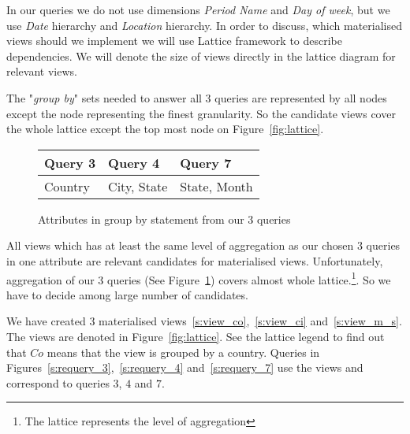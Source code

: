 
In our queries we do not use dimensions {\it Period Name} and {\it Day of week}, but 
we use {\it Date} hierarchy and {\it Location} hierarchy. 
In order to discuss, which materialised views should we implement we will use Lattice framework to describe dependencies. We will denote the size of views directly in the lattice diagram for relevant views.

 The "{\it group by}" sets needed to answer all 3 queries are represented by all nodes except the node representing the finest granularity. So the candidate views cover the whole lattice except the top most node on Figure~\ref{fig:lattice}. 


\begin{figure}[!hbp]
\caption{\label{t:groupby}Attributes in group by statement from our 3 queries}
\begin{center}
\begin{tabular}{|p{3cm}|p{3cm}|p{5cm}|}
\hline
Query 3 & Query 4 & Query  7\\
\hline
\hline
Country & City, State  & State, Month\\
\hline
\end{tabular}
\end{center}
\end{figure}

 All views which has at least the same level of aggregation as our chosen 3 queries in one attribute are relevant candidates for materialised views. Unfortunately, aggregation of our 3 queries (See Figure~\ref{t:groupby}) covers almost whole 
 lattice.\footnote{The lattice represents the level of aggregation}. So we have to decide among large number of candidates.

We have created 3 materialised views~\ref{s:view_co},~\ref{s:view_ci} and~\ref{s:view_m_s}.
The views are denoted in Figure~\ref{fig:lattice}.
See the lattice legend to find out that ${Co}$ means that
the view is grouped by a country.
Queries in Figures~\ref{s:requery_3},~\ref{s:requery_4} and~\ref{s:requery_7} use the views and correspond to queries $3$, $4$ and $7$.

